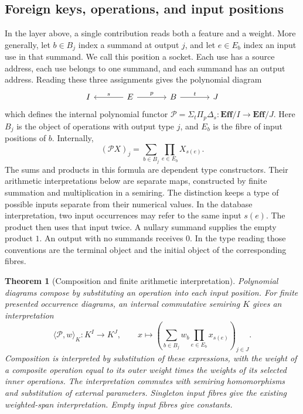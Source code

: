 \documentclass[11pt,a4paper]{article}
\newtheorem{theorem}{Theorem}[section]
\theoremstyle{definition}
\theoremstyle{remark}\newaliascnt{remark}{theorem}
\newcommand{\E}{\mathbf{Eff}}
\numberwithin{equation}{section}
\begin{document}
\subsection{Foreign keys, operations, and input positions}
In the layer above, a single contribution reads both a feature and a weight. More generally, let $b\in B_j$ index a summand at output $j$, and let $e\in E_b$ index an input use in that summand. We call this position a socket. Each use has a source address, each use belongs to one summand, and each summand has an output address. Reading these three assignments gives the polynomial diagram \cite{poly:gambino-kock,poly:containers}
\[
\begin{tikzcd}[column sep=large]
 I & E \arrow[l,"s"'] \arrow[r,"p"] & B \arrow[r,"t"] & J
\end{tikzcd}
\]
which defines the internal polynomial functor
$\mathcal P=\Sigma_t\Pi_p\Delta_s:\E/I\to\E/J$.
Here $B_j$ is the object of operations with output type $j$, and
$E_b$ is the fibre of input positions of $b$. Internally,
\[
 (\mathcal P X)_j=\sum_{b\in B_j}\prod_{e\in E_b}X_{s(e)}.
\]
The sums and products in this formula are dependent type constructors.
Their arithmetic interpretations below are separate maps, constructed
by finite summation and multiplication in a semiring. The distinction
keeps a type of possible inputs separate from their numerical values.
In the database interpretation, two input occurrences may refer to the same input \(s(e)\). The product then uses that input twice. A nullary summand supplies the empty product \(1\). An output with no summands receives \(0\). In the type reading those conventions are the terminal object and the initial object of the corresponding fibres.
\begin{theorem}[Composition and finite arithmetic interpretation]
\label{poly:thm:interpretation}
Polynomial diagrams compose by substituting an operation into each
input position. For finite presented occurrence diagrams, an internal
commutative semiring $K$ gives an interpretation
\[
 \langle\mathcal P,w\rangle_K:K^I\to K^J,\qquad
 x\longmapsto
 \left(\sum_{b\in B_j}w_b\prod_{e\in E_b}x_{s(e)}\right)_{j\in J}.
\]
Composition is interpreted by substitution of these expressions, with
the weight of a composite operation equal to its outer weight times
the weights of its selected inner operations. The interpretation
commutes with semiring homomorphisms and substitution of external
parameters. Singleton input fibres give the existing weighted-span
interpretation. Empty input fibres give constants.
\end{theorem}
\end{document}
